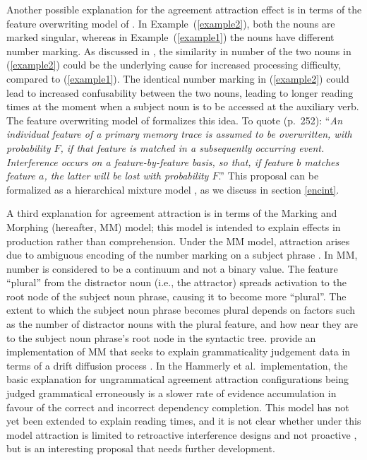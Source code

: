 \documentclass{cambridge7A}\usepackage[]{graphicx}\usepackage[]{color}
\begin{document}
Another possible explanation for the agreement attraction effect is in terms of the  feature overwriting model of \cite{Nairne1990}. In Example~(\ref{example2}),
both the nouns are marked singular, whereas in Example~(\ref{example1}) the nouns have different number marking. 
As discussed in \cite{VillataFranck},
the similarity in number of the two nouns in (\ref{example2}) could be the underlying cause for increased processing difficulty, compared to (\ref{example1}).
The identical number marking in (\ref{example2}) could lead to increased  confusability between the two nouns, leading to longer reading times at the moment when a subject noun is to be accessed at the auxiliary verb. 
The feature overwriting model of \cite{Nairne1990} formalizes this idea. To quote (p.\ 252):
``\textit{An individual feature of a primary memory trace is assumed to be overwritten, with probability $F$, if that feature is matched in a subsequently occurring event. Interference occurs on a feature-by-feature basis, so that, if feature $b$ matches feature $a$, the latter will be lost with probability $F$}.''
 This proposal can be formalized as a hierarchical mixture model \citep{VasishthEtAlICCM2017}, as we discuss in section \ref{encint}.

A third explanation for agreement attraction is in terms of the  Marking and Morphing (hereafter, MM) model; this model is intended to explain effects in production rather than comprehension.  Under the MM model, attraction arises due to ambiguous encoding of the number marking on a subject phrase \citep[e.g.,][]{EberhardCuttingBock2005}. In MM, number is considered to be a continuum and not a binary value. The feature ``plural'' from the distractor noun (i.e., the attractor) spreads activation to the root node of the subject noun phrase, causing it to become more ``plural''. The extent to which the subject noun phrase becomes plural depends on factors such as the number of distractor nouns with the plural feature, and how near they are to the subject noun phrase's root node in the syntactic tree. \cite{hammerly2019grammaticality} provide an implementation of MM that seeks to explain grammaticality judgement data in terms of a  drift diffusion process \citep{Ratcliff1978}. In the Hammerly  et al.\ implementation, the basic explanation for ungrammatical agreement attraction configurations being judged grammatical erroneously is a slower rate of evidence accumulation in favour of the correct and incorrect dependency completion. This model has not yet been extended to explain reading times,  and it is not clear whether under this model attraction is limited to retroactive interference designs and not proactive \citep{ALV2020},  but is an interesting proposal that needs further development.
\end{document}
